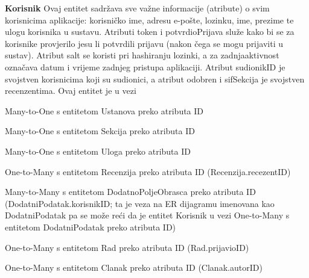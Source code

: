 				\textbf{Korisnik}
				\newline
				\indent Ovaj entitet sadržava sve važne informacije (atribute) o svim korisnicima aplikacije: korisničko ime, adresu e-pošte, lozinku, ime, prezime te ulogu korisnika u sustavu. Atributi token i potvrdioPrijava služe kako bi se za korisnike provjerilo jesu li potvrdili prijavu (nakon čega se mogu prijaviti u sustav). Atribut salt se koristi pri hashiranju lozinki, a za zadnjaaktivnost označava datum i vrijeme zadnjeg pristupa aplikaciji. Atribut sudionikID je svojstven korisnicima koji su sudionici, a atribut odobren i sifSekcija je svojstven recenzentima. Ovaj entitet je u vezi \begin{packed_item} 
					\item Many-to-One s entitetom Ustanova preko atributa ID
					\item Many-to-One s entitetom Sekcija preko atributa ID
					\item Many-to-One s entitetom Uloga preko atributa ID
					\item One-to-Many s entitetom Recenzija preko atributa ID (Recenzija.recezentID)
					\item Many-to-Many s entitetom DodatnoPoljeObrasca preko atributa ID (DodatniPodatak.korisnikID; ta je veza na ER dijagramu imenovana kao DodatniPodatak pa se može reći da je entitet Korisnik u vezi One-to-Many s entitetom DodatniPodatak preko atributa ID)
					\item One-to-Many s entitetom Rad preko atributa ID (Rad.prijavioID)
					
					\item One-to-Many s entitetom Clanak preko atributa ID (Clanak.autorID)
					
				\end{packed_item}
